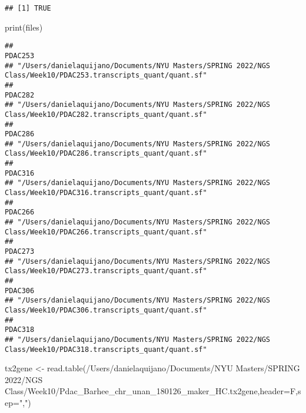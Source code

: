 \documentclass[
]{article}
\newenvironment{Shaded}{\begin{snugshade}}{\end{snugshade}}
\newcommand{\AttributeTok}[1]{\textcolor[rgb]{0.77,0.63,0.00}{#1}}
\newcommand{\FunctionTok}[1]{\textcolor[rgb]{0.00,0.00,0.00}{#1}}
\newcommand{\NormalTok}[1]{#1}
\newcommand{\OtherTok}[1]{\textcolor[rgb]{0.56,0.35,0.01}{#1}}
\newcommand{\StringTok}[1]{\textcolor[rgb]{0.31,0.60,0.02}{#1}}
\begin{document}
\begin{verbatim}
## [1] TRUE
\end{verbatim}

\begin{Shaded}
\begin{Highlighting}[]
\FunctionTok{print}\NormalTok{(files)}
\end{Highlighting}
\end{Shaded}

\begin{verbatim}
##                                                                                                       PDAC253 
## "/Users/danielaquijano/Documents/NYU Masters/SPRING 2022/NGS Class/Week10/PDAC253.transcripts_quant/quant.sf" 
##                                                                                                       PDAC282 
## "/Users/danielaquijano/Documents/NYU Masters/SPRING 2022/NGS Class/Week10/PDAC282.transcripts_quant/quant.sf" 
##                                                                                                       PDAC286 
## "/Users/danielaquijano/Documents/NYU Masters/SPRING 2022/NGS Class/Week10/PDAC286.transcripts_quant/quant.sf" 
##                                                                                                       PDAC316 
## "/Users/danielaquijano/Documents/NYU Masters/SPRING 2022/NGS Class/Week10/PDAC316.transcripts_quant/quant.sf" 
##                                                                                                       PDAC266 
## "/Users/danielaquijano/Documents/NYU Masters/SPRING 2022/NGS Class/Week10/PDAC266.transcripts_quant/quant.sf" 
##                                                                                                       PDAC273 
## "/Users/danielaquijano/Documents/NYU Masters/SPRING 2022/NGS Class/Week10/PDAC273.transcripts_quant/quant.sf" 
##                                                                                                       PDAC306 
## "/Users/danielaquijano/Documents/NYU Masters/SPRING 2022/NGS Class/Week10/PDAC306.transcripts_quant/quant.sf" 
##                                                                                                       PDAC318 
## "/Users/danielaquijano/Documents/NYU Masters/SPRING 2022/NGS Class/Week10/PDAC318.transcripts_quant/quant.sf"
\end{verbatim}

\begin{Shaded}
\begin{Highlighting}[]
\NormalTok{tx2gene }\OtherTok{\textless{}{-}} \FunctionTok{read.table}\NormalTok{(}\StringTok{\textquotesingle{}/Users/danielaquijano/Documents/NYU Masters/SPRING 2022/NGS Class/Week10/Pdac\_Barhee\_chr\_unan\_180126\_maker\_HC.tx2gene\textquotesingle{}}\NormalTok{,}\AttributeTok{header=}\NormalTok{F,}\AttributeTok{sep=}\StringTok{","}\NormalTok{)}
\end{Highlighting}
\end{Shaded}
\end{document}
